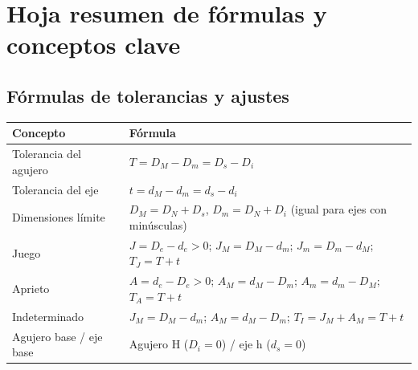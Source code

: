 \documentclass[12pt,a4paper]{article}
\begin{document}
\section{Hoja resumen de fórmulas y conceptos clave}

\subsection{Fórmulas de tolerancias y ajustes}
\begin{center}
	\small
	\begin{tabular}{@{}ll@{}}
		\toprule
		\textbf{Concepto}       & \textbf{Fórmula}
		\\
		\midrule
		Tolerancia del agujero  & $T = D_M - D_m = D_s - D_i$
		\\
		Tolerancia del eje      & $t = d_M - d_m = d_s - d_i$
		\\
		Dimensiones límite      & $D_M = D_N + D_s$, $D_m = D_N + D_i$ (igual para
		ejes con minúsculas)
		\\
		Juego                   & $J = D_e - d_e > 0$; $J_M = D_M - d_m$; $J_m = D_m
			                                                                  - d_M$;
		$T_J = T + t$
		\\
		Aprieto                 & $A = d_e - D_e > 0$; $A_M = d_M - D_m$; $A_m = d_m
			                                                                  - D_M$;
		$T_A = T + t$
		\\
		Indeterminado           & $J_M = D_M - d_m$; $A_M = d_M - D_m$; $T_I = J_M +
			                                                                A_M = T +
			                                                                t$ \\
		Agujero base / eje base & Agujero H ($D_i = 0$) / eje h ($d_s = 0$)
		\\
		\bottomrule
	\end{tabular}
\end{center}
\end{document}
